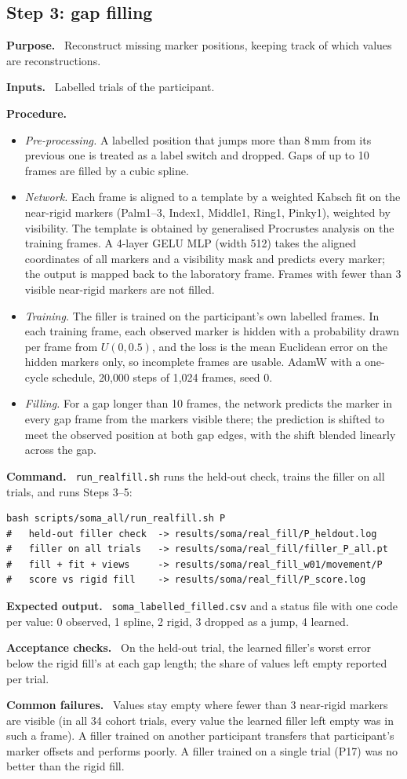 \documentclass[11pt,a4paper]{article}
\newcommand{\field}[1]{\par\smallskip\noindent\textbf{#1.}\ }
\begin{document}
\subsection{Step 3: gap filling}\label{sec:step-fill}
\field{Purpose} Reconstruct missing marker positions, keeping track of which values are reconstructions.
\field{Inputs} Labelled trials of the participant.
\field{Procedure}
\begin{itemize}[nosep]
  \item \emph{Pre-processing.} A labelled position that jumps more than 8\,mm from its previous one is treated as a
  label switch and dropped. Gaps of up to 10 frames are filled by a cubic spline.
  \item \emph{Network.} Each frame is aligned to a template by a weighted Kabsch fit \citep{kabsch1976} on the
  near-rigid markers (Palm1--3, Index1, Middle1, Ring1, Pinky1), weighted by visibility. The template is obtained by
  generalised Procrustes analysis \citep{gower1975procrustes} on the training frames. A 4-layer GELU MLP (width 512)
  takes the aligned coordinates of all markers and a visibility mask and predicts every marker; the output is mapped
  back to the laboratory frame. Frames with fewer than 3 visible near-rigid markers are not filled.
  \item \emph{Training.} The filler is trained on the participant's own labelled frames. In each training frame,
  each observed marker is hidden with a probability drawn per frame from $U(0, 0.5)$, and the loss is the mean
  Euclidean error on the hidden markers only, so incomplete frames are usable. AdamW with a one-cycle schedule,
  20{,}000 steps of 1{,}024 frames, seed 0.
  \item \emph{Filling.} For a gap longer than 10 frames, the network predicts the marker in every gap frame from the
  markers visible there; the prediction is shifted to meet the observed position at both gap edges, with the shift
  blended linearly across the gap.
\end{itemize}
\field{Command} \texttt{run\_realfill.sh} runs the held-out check, trains the filler on all trials, and runs Steps 3--5:
\begin{lstlisting}
bash scripts/soma_all/run_realfill.sh P
#   held-out filler check  -> results/soma/real_fill/P_heldout.log
#   filler on all trials   -> results/soma/real_fill/filler_P_all.pt
#   fill + fit + views     -> results/soma/real_fill_w01/movement/P
#   score vs rigid fill    -> results/soma/real_fill/P_score.log
\end{lstlisting}
\field{Expected output} \texttt{soma\_labelled\_filled.csv} and a status file with one code per value: 0 observed,
1 spline, 2 rigid, 3 dropped as a jump, 4 learned.
\field{Acceptance checks} On the held-out trial, the learned filler's worst error below the rigid fill's at each gap
length; the share of values left empty reported per trial.
\field{Common failures} Values stay empty where fewer than 3 near-rigid markers are visible (in all 34 cohort trials,
every value the learned filler left empty was in such a frame). A filler trained on another participant transfers
that participant's marker offsets and performs poorly. A filler trained on a single trial (P17) was no better than the
rigid fill.
\end{document}
